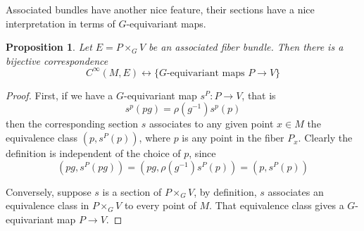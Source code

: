 \documentclass[11pt]{amsart}
\numberwithin{equation}{section}
\theoremstyle{plain}
\theoremstyle{plain}
\newtheorem{propsub}[thmsub]{Proposition}
\numberwithin{equation}{section}
\begin{document}
Associated bundles have another nice feature, their sections have a nice interpretation in terms of $G$-equivariant maps.
\begin{propsub}
Let $E=P\times_GV$ be an associated fiber bundle. Then there is a bijective correspondence
$$
C^{\infty}(M, E) \longleftrightarrow\{G\text {-equivariant maps } P \rightarrow V\}
$$
\end{propsub}
\begin{proof}
First, if we have a $G$-equivariant map $s^P:P\to V$, that is 
$$
s^p(pg)=\rho(g^{-1})s^p(p)
$$
then the corresponding section $s$ associates to any given point $x\in M$ the equivalence class $(p,s^P(p))$, where $p$ is any point in the fiber $P_x$. Clearly the definition is independent of the choice of $p$, since
$$
(pg,s^P(pg))=(pg,\rho(g^{-1})s^P(p))=(p,s^P(p))
$$

Conversely, suppose $s$ is a section of $P\times_GV$, by definition, $s$ associates an equivalence class in $P\times_GV$ to every point of $M$. That equivalence class gives a $G$-equivariant map $P\to V$.
\end{proof}
\end{document}

